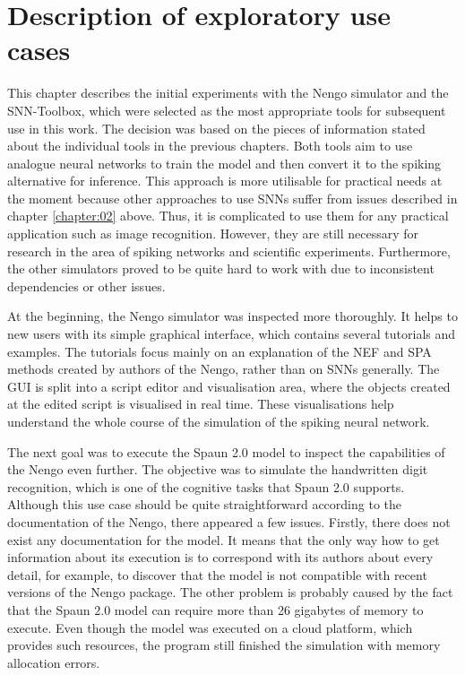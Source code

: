 \chapter{Description of exploratory use cases} \label{chapter:05}

This chapter describes the initial experiments with the Nengo simulator and the SNN-Toolbox, which were selected as the most appropriate tools for subsequent use in this work. The decision was based on the pieces of information stated about the individual tools in the previous chapters. Both tools aim to use analogue neural networks to train the model and then convert it to the spiking alternative for inference. This approach is more utilisable for practical needs at the moment because other approaches to use SNNs suffer from issues described in chapter \ref{chapter:02} above. Thus, it is complicated to use them for any practical application such as image recognition. However, they are still necessary for research in the area of spiking networks and scientific experiments. Furthermore, the other simulators proved to be quite hard to work with due to inconsistent dependencies or other issues. \par
At the beginning, the Nengo simulator was inspected more thoroughly. It helps to new users with its simple graphical interface, which contains several tutorials and examples. The tutorials focus mainly on an explanation of the NEF and SPA methods created by authors of the Nengo, rather than on SNNs generally. The GUI is split into a script editor and visualisation area, where the objects created at the edited script is visualised in real time. These visualisations help understand the whole course of the simulation of the spiking neural network. \par
The next goal was to execute the Spaun 2.0 model to inspect the capabilities of the Nengo even further. The objective was to simulate the handwritten digit recognition, which is one of the cognitive tasks that Spaun 2.0 supports. Although this use case should be quite straightforward according to the documentation of the Nengo, there appeared a few issues. Firstly, there does not exist any documentation for the model. It means that the only way how to get information about its execution is to correspond with its authors about every detail, for example, to discover that the model is not compatible with recent versions of the Nengo package. The other problem is probably caused by the fact that the Spaun 2.0 model can require more than 26 gigabytes of memory to execute. Even though the model was executed on a cloud platform, which provides such resources, the program still finished the simulation with memory allocation errors. \par
